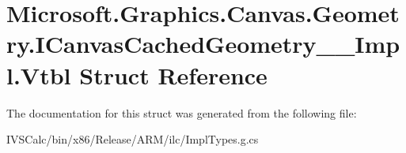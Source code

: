 \hypertarget{struct_microsoft_1_1_graphics_1_1_canvas_1_1_geometry_1_1_i_canvas_cached_geometry_____impl_1_1_vtbl}{}\section{Microsoft.\+Graphics.\+Canvas.\+Geometry.\+I\+Canvas\+Cached\+Geometry\+\_\+\+\_\+\+Impl.\+Vtbl Struct Reference}
\label{struct_microsoft_1_1_graphics_1_1_canvas_1_1_geometry_1_1_i_canvas_cached_geometry_____impl_1_1_vtbl}


The documentation for this struct was generated from the following file\+:\begin{DoxyCompactItemize}
\item 
I\+V\+S\+Calc/bin/x86/\+Release/\+A\+R\+M/ilc/Impl\+Types.\+g.\+cs\end{DoxyCompactItemize}
